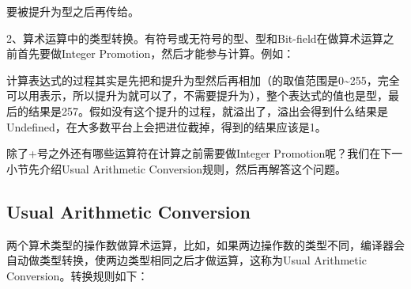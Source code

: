 要被提升为型之后再传给。



2、算术运算中的类型转换。有符号或无符号的型、型和Bit-field在做算术运算之前首先要做Integer Promotion，然后才能参与计算。例如：




计算表达式的过程其实是先把和提升为型然后再相加（的取值范围是0\textasciitilde{}\BookSplit{}255，完全可以用表示，所以提升为就可以了，不需要提升为），整个表达式的值也是型，最后的结果是257。假如没有这个提升的过程，就溢出了，溢出会得到什么结果是Undefined，在大多数平台上会把进位截掉，得到的结果应该是1。



除了+号之外还有哪些运算符在计算之前需要做Integer Promotion呢？我们在下一小节先介绍Usual Arithmetic Conversion规则，然后再解答这个问题。


\subsection{Usual Arithmetic Conversion}
%


两个算术类型的操作数做算术运算，比如，如果两边操作数的类型不同，编译器会自动做类型转换，使两边类型相同之后才做运算，这称为Usual Arithmetic Conversion。转换规则如下：


